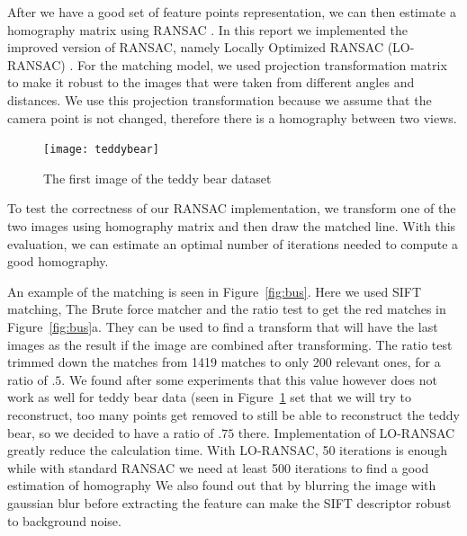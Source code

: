 After we have a good set of feature points representation, we can then estimate a homography matrix using RANSAC \cite{RANSAC}. 
In this report we implemented the improved version of RANSAC, namely Locally Optimized RANSAC (LO-RANSAC) \cite{LORANSAC}.
For the matching model, we used projection transformation matrix to make it robust to the images that were taken from different angles and distances.
We use this projection transformation because we assume that the camera point is not changed, therefore there is a homography between two views.

\begin{figure}[ht]
	\centering
	\texttt{[image: teddybear]}
	\caption{The first image of the teddy bear dataset}
	\label{fig:bear}
\end{figure}

To test the correctness of our RANSAC implementation, we transform one of the two images using homography matrix and then draw the matched line.
With this evaluation, we can estimate an optimal number of iterations needed to compute a good homography.


An example of the matching is seen in Figure~\ref{fig:bus}. 
Here we used SIFT matching, The Brute force matcher and the ratio test to get the red matches in Figure~\ref{fig:bus}a. 
They can be used to find a transform that will have the last images as the result if the image are combined after transforming.
The ratio test trimmed down the matches from 1419 matches to only 200 relevant ones, for a ratio of $.5$.
We found after some experiments that this value however does not work as well for teddy bear data (seen in Figure~\ref{fig:bear} set that we will try to reconstruct,
too many points get removed to still be able to reconstruct the teddy bear,
so we decided to have a ratio of $.75$ there.
Implementation of LO-RANSAC greatly reduce the calculation time.
With LO-RANSAC, 50 iterations is enough while with standard RANSAC we need at least 500 iterations to find a good estimation of homography
We also found out that by blurring the image with gaussian blur before extracting the feature can make the SIFT descriptor robust to background noise.
